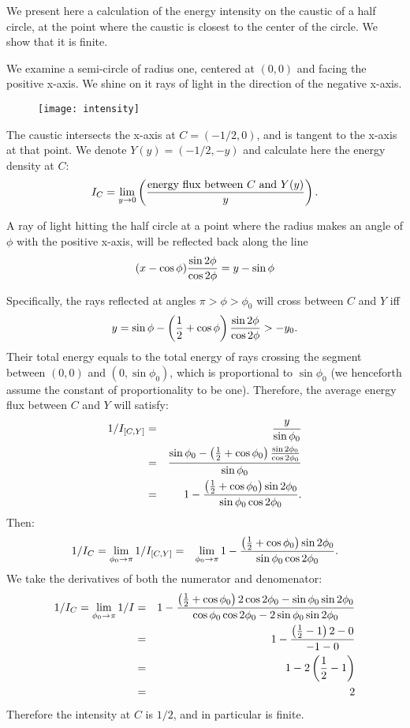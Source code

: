 \documentclass{article}
\begin{document}
We present here a calculation of the energy intensity on the caustic of a half circle, at the point where the caustic is closest to the center of the circle. We show that it is finite.

We examine a semi-circle of radius one, centered at $(0,0)$ and facing the positive x-axis. We shine on it rays of light in the direction of the negative x-axis. 

\begin{figure}[htp]
\centering
\texttt{[image: intensity]}
\end{figure}


The caustic intersects the x-axis at $C=(-1/2,0)$, and is tangent to the x-axis at that point. We denote $Y(y)=(-1/2,-y)$ and calculate here the energy density at $C$:
\begin{equation}
  I_C = \lim_{y\to 0} \left({\textrm{energy flux between } C \textrm{ and } Y(y)}\over y\right).
\end{equation}

A ray of light hitting the half circle at a point where the radius makes an angle of $\phi$ with the positive x-axis, will be reflected back along the line
\begin{equation}
  (x-\cos\phi){\sin 2\phi \over \cos 2\phi}=y-\sin\phi
\end{equation}

Specifically, the rays reflected at angles $\pi>\phi>\phi_0$ will cross between $C$ and $Y$ iff 
\begin{equation}
y=\sin\phi-\left({1 \over 2}+\cos\phi\right){\sin2\phi\over \cos2\phi}>-y_0.
\end{equation}
Their total energy equals to the total energy of rays crossing the segment between $(0,0)$ and $(0,\sin\phi_0)$, which is proportional to $\sin\phi_0$ (we henceforth assume the constant of proportionality to be one). Therefore, the average energy flux between $C$ and $Y$ will satisfy:
\begin{eqnarray}
1/I_{[C,Y]}&=&{y\over \sin\phi_0}\\
&=&{\sin\phi_0-\left({1 \over 2}+\cos\phi_0\right){\sin2\phi_0\over \cos2\phi_0} \over \sin\phi_0}\\
&=&1-{\left({1\over 2}+\cos\phi_0\right)\sin2\phi_0\over \sin\phi_0\cos2\phi_0}.
\end{eqnarray} 
Then:
\begin{eqnarray}
1/I_C=\lim_{\phi_0\to\pi}1/I_{[C,Y]}&=&\lim_{\phi_0\to\pi}1-{\left({1\over 2}+\cos\phi_0\right)\sin2\phi_0\over \sin\phi_0\cos2\phi_0}.
\end{eqnarray}
We take the derivatives of both the numerator and denomenator:
\begin{eqnarray}
1/I_C=\lim_{\phi_0\to\pi}1/I&=&1-{\left({1\over2}+\cos\phi_0\right)2\cos2\phi_0-\sin\phi_0\sin2\phi_0\over\cos\phi_0\cos2\phi_0-2\sin\phi_0\sin2\phi_0}\\
&=&1-{\left({1\over2}-1\right)2-0\over -1-0}\\
&=&1-2\left({1\over2}-1\right)\\
&=&2
\end{eqnarray} 
 Therefore the intensity at $C$ is $1/2$, and in particular is finite.
\end{document}
